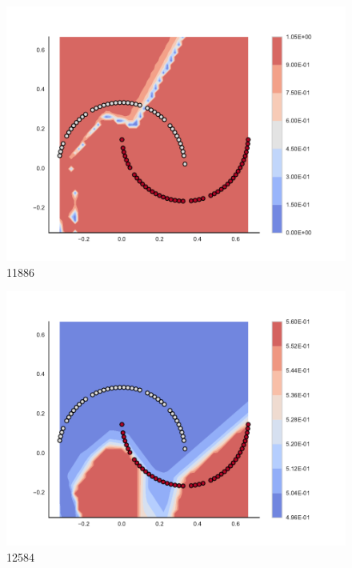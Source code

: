 \begin{subfigure}[b]{0.12\textwidth}
    \includegraphics[clip, trim=2.35cm 1.75cm 4.5cm 0cm,width=\textwidth]{img/convergence/11886.pdf}
    \caption{11886}
    \label{fig:convergence_11886}
\end{subfigure}
%
\begin{subfigure}[b]{0.12\textwidth}
    \includegraphics[clip, trim=2.35cm 1.75cm 4.5cm 0cm,width=\textwidth]{img/convergence/12584.pdf}
    \caption{12584}
    \label{fig:convergence_12584}
\end{subfigure}
%

